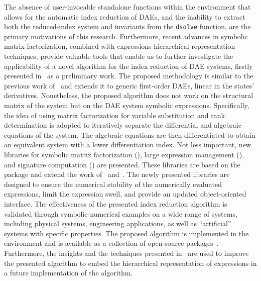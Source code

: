 The absence of user-invocable standalone functions within the \Maple{} environment that allows for the automatic index reduction of \acp{DAE}, and the inability to extract both the reduced-index system and invariants from the \texttt{dsolve} function, are the primary motivations of this research. Furthermore, recent advances in symbolic matrix factorization, combined with expressions hierarchical representation techniques, provide valuable tools that enable us to further investigate the applicability of a novel algorithm for the index reduction of \ac{DAE} systems, firstly presented in~\cite{stocco2024symbolic} as a preliminary work. The proposed methodology is similar to the previous work of~\citet{chowdhry2004symbolic} and extends it to generic first-order \acp{DAE}, linear in the states' derivatives. Nonetheless, the proposed algorithm does not work on the structural matrix of the system but on the \ac{DAE} system symbolic expressions. Specifically, the idea of using matrix factorization for variable substitution and rank determination is adopted to iteratively separate the differential and algebraic equations of the system. The algebraic equations are then differentiated to obtain an equivalent system with a lower differentiation index. Not less important, new libraries for symbolic matrix factorization (\LAST{}), large expression management (\LEM{}), and signature computation (\SIG{}) are presented. These libraries are based on the \LULEM{} package and extend the work of~\citet{zhou2006hierarchical, carette2006linear} and~\citet{zhou2007symbolic}. The newly presented libraries are designed to ensure the numerical stability of the numerically evaluated expressions, limit the expression swell, and provide an updated object-oriented interface. The effectiveness of the presented index reduction algorithm is validated through symbolic-numerical examples on a wide range of systems, including physical systems, engineering applications, as well as ``artificial'' systems with specific properties. The proposed algorithm is implemented in the \Maple{} environment and is available as a collection of open-source packages~\cite{last, lem}. Furthermore, the insights and the techniques presented in~\cite{zhou2006hierarchical, carette2006linear, zhou2007symbolic} are used to improve the presented algorithm to embed the hierarchical representation of expressions in a future implementation of the algorithm.

